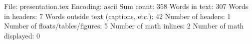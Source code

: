 File: presentation.tex
Encoding: ascii
Sum count: 358
Words in text: 307
Words in headers: 7
Words outside text (captions, etc.): 42
Number of headers: 1
Number of floats/tables/figures: 5
Number of math inlines: 2
Number of math displayed: 0

